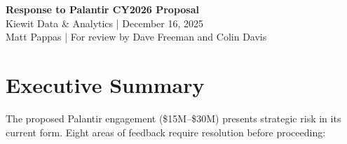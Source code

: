 \documentclass[11pt, letterpaper]{article}
\begin{document}
\begin{center}
{\Large \textbf{Response to Palantir CY2026 Proposal}}\\[0.5em]
{\color{accent}\small Kiewit Data \& Analytics | December 16, 2025}\\[0.3em]
{\small Matt Pappas | For review by Dave Freeman and Colin Davis}
\end{center}

\vspace{1em}

\section*{Executive Summary}

The proposed Palantir engagement (\$15M--\$30M) presents strategic risk in its current form. Eight areas of feedback require resolution before proceeding:

\vspace{0.3em}
\end{document}

